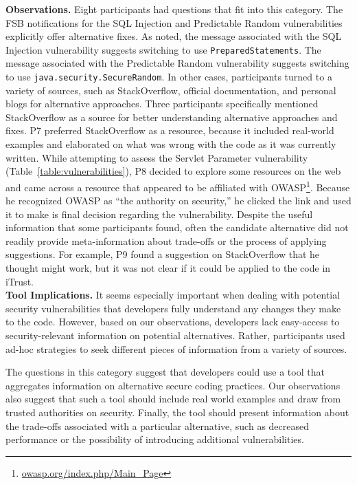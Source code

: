 \documentclass[conference]{IEEEtran}
\begin{document}
\noindent\textbf{Observations.}
Eight participants had questions that fit into this category. 
The FSB notifications for the SQL Injection and Predictable Random vulnerabilities explicitly offer alternative fixes. 
As noted, the message associated with the SQL Injection vulnerability suggests switching to use \texttt{PreparedStatements}. 
The message associated with the Predictable Random vulnerability suggests switching to use \texttt{java.security.SecureRandom}. 
In other cases, participants turned to a variety of sources, such as StackOverflow, official documentation, and personal blogs for alternative approaches. 
Three participants specifically mentioned StackOverflow as a source for better understanding alternative approaches and fixes. 
P7 preferred StackOverflow as a resource, because it included real-world examples and elaborated on what was wrong with the code as it was currently written.  
While attempting to assess the Servlet Parameter vulnerability (Table~\ref{table:vulnerabilities}), P8 decided to explore some resources on the web and came across a resource that appeared to be affiliated with OWASP\footnote{\url{owasp.org/index.php/Main_Page}}. 
Because he recognized OWASP as ``the authority on security,'' he clicked the link and used it to make is final decision regarding the vulnerability. 
Despite the useful information that some participants found, often the candidate alternative did not readily provide meta-information about trade-offs or the process of applying suggestions. 
For example, P9 found a suggestion on StackOverflow that he thought might work, but it was not clear if it could be applied to the code in iTrust. 
\\

\noindent\textbf{Tool Implications.} 
It seems especially important when dealing with potential security vulnerabilities that developers fully understand any changes they make to the code. 
However, based on our observations, developers lack easy-access to security-relevant information on potential alternatives. 
Rather, participants used ad-hoc strategies to seek different pieces of information from a variety of sources. 

The questions in this category suggest that developers could use a tool that aggregates information on alternative secure coding practices.
Our observations also suggest that such a tool should include real world examples and draw from trusted authorities on security.
Finally, the tool should present information about the trade-offs associated with a particular alternative, such as decreased performance or the possibility of introducing additional vulnerabilities. 
\end{document}
